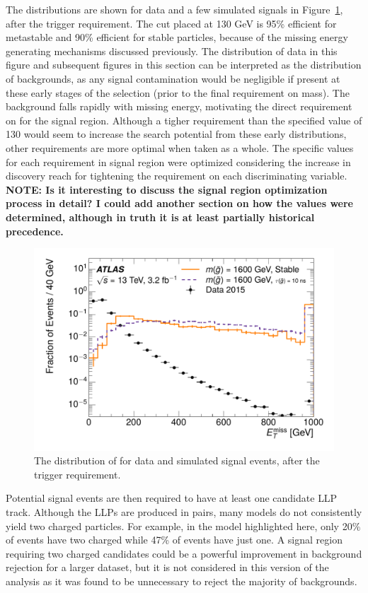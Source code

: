 The \met distributions are shown for data and a few simulated signals in Figure~\ref{fig:nm1_met}, after the trigger requirement.
The cut placed at 130 GeV is 95\% efficient for metastable and 90\% efficient for stable particles, because of the missing energy generating mechanisms discussed previously.
The distribution of data in this figure and subsequent figures in this section can be interpreted as the distribution of backgrounds, as any signal contamination would be negligible if present at these early stages of the selection (prior to the final requirement on mass). 
The background falls rapidly with missing energy, motivating the direct requirement on \met for the signal region.
Although a tigher requirement than the specified value of 130 \GeV would seem to increase the search potential from these early distributions, other requirements are more optimal when taken as a whole.
The specific values for each requirement in signal region were optimized considering the increase in discovery reach for tightening the requirement on each discriminating variable. \textbf{NOTE: Is it interesting to discuss the signal region optimization process in detail? I could add another section on how the values were determined, although in truth it is at least partially historical precedence.}

\begin{figure}[h]
\centering
\includegraphics[width=\fullfig]{figures/selection_met_nm1_log.pdf}
\caption{The distribution of \met for data and simulated signal events, after the trigger requirement.}
\label{fig:nm1_met}
\end{figure}

Potential signal events are then required to have at least one candidate \ac{LLP} track.
Although the \acp{LLP} are produced in pairs, many models do not consistently yield two charged particles.
For example, in the \rhadron model highlighted here, only 20\% of events have two charged \rhadrons while 47\% of events have just one.
A signal region requiring two charged candidates could be a powerful improvement in background rejection for a larger dataset, but it is not considered in this version of the analysis as it was found to be unnecessary to reject the majority of backgrounds.

